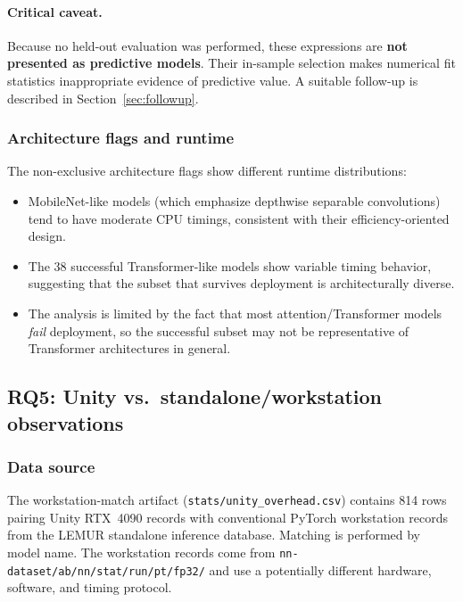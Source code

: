 \documentclass[10pt,twocolumn]{article}
\begin{document}
\paragraph{Critical caveat.}
Because no held-out evaluation was performed, these expressions are \textbf{not presented as predictive models}. Their in-sample selection makes numerical fit statistics inappropriate evidence of predictive value. A suitable follow-up is described in Section~\ref{sec:followup}.

\subsubsection{Architecture flags and runtime}

The non-exclusive architecture flags show different runtime distributions:
\begin{itemize}[nosep,leftmargin=*]
  \item MobileNet-like models (which emphasize depthwise separable convolutions) tend to have moderate CPU timings, consistent with their efficiency-oriented design.
  \item The 38 successful Transformer-like models show variable timing behavior, suggesting that the subset that survives deployment is architecturally diverse.
  \item The analysis is limited by the fact that most attention/Transformer models \emph{fail} deployment, so the successful subset may not be representative of Transformer architectures in general.
\end{itemize}

\subsection{RQ5: Unity vs.\ standalone/workstation observations}\label{sec:rq5}

\subsubsection{Data source}

The workstation-match artifact (\texttt{stats/unity\_overhead.csv}) contains 814 rows pairing Unity RTX~4090 records with conventional PyTorch workstation records from the LEMUR standalone inference database. Matching is performed by model name. The workstation records come from \texttt{nn-dataset/ab/nn/stat/run/pt/fp32/} and use a potentially different hardware, software, and timing protocol.
\end{document}
